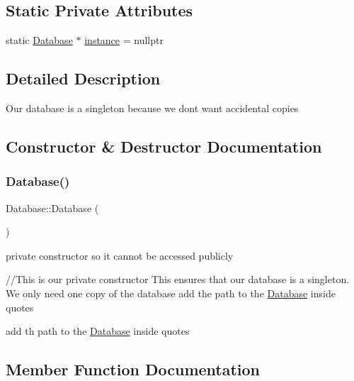 \subsection*{Static Private Attributes}
\begin{DoxyCompactItemize}
\item 
static \hyperlink{class_database}{Database} $\ast$ \hyperlink{class_database_a5926460fe1c15c95d470fcde637f8d22}{instance} = nullptr
\end{DoxyCompactItemize}


\subsection{Detailed Description}
Our database is a singleton because we dont want accidental copies 

\subsection{Constructor \& Destructor Documentation}
\mbox{\label{class_database_a4703c80e6969d33565ea340f768fdadf}} 
\subsubsection{\texorpdfstring{Database()}{Database()}}
{\footnotesize\ttfamily Database\+::\+Database (\begin{DoxyParamCaption}{ }\end{DoxyParamCaption})\hspace{0.3cm}{\ttfamily [private]}}

private constructor so it cannot be accessed publicly

//\+This is our private constructor This ensures that our database is a singleton. We only need one copy of the database add the path to the \hyperlink{class_database}{Database} inside quotes

add th path to the \hyperlink{class_database}{Database} inside quotes 

\subsection{Member Function Documentation}
\mbox{\label{class_database_a5a3b028f980a577ea0b809eb92312761}} 
